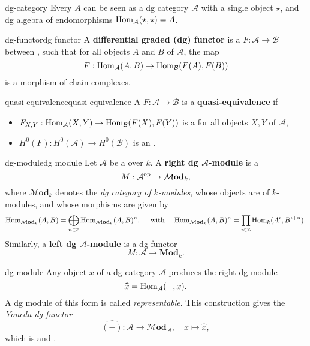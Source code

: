 \begin{example}{dg-category}
    Every  $A$ can be seen as a dg category $\mathcal{A}$ with a single object $\star$, and dg algebra of endomorphisms $\text{Hom}_\mathcal{A}(\star, \star) = A$.
\end{example}

\begin{topic}{dg-functor}{dg functor}
    A \textbf{differential graded (dg) functor} is a  $F : \mathcal{A} \to \mathcal{B}$ between , such that for all objects $A$ and $B$ of $\mathcal{A}$, the map
    \[ F : \text{Hom}_\mathcal{A}(A, B) \to \text{Hom}_\mathcal{B}(F(A), F(B)) \]
    is a morphism of chain complexes.
\end{topic}

\begin{topic}{quasi-equivalence}{quasi-equivalence}
    A  $F : \mathcal{A} \to \mathcal{B}$ is a \textbf{quasi-equivalence} if
    \begin{itemize}
        \item $F_{X, Y} : \text{Hom}_\mathcal{A}(X, Y) \to \text{Hom}_\mathcal{B}(F(X), F(Y))$ is a  for all objects $X, Y$ of $\mathcal{A}$,
        \item $H^0(F) : H^0(\mathcal{A}) \to H^0(\mathcal{B})$ is an .
    \end{itemize}
\end{topic}

\begin{topic}{dg-module}{dg module}
    Let $\mathcal{A}$ be a   over $k$. A \textbf{right dg $\mathcal{A}$-module} is a 
    \[ M : \mathcal{A}^\textup{op} \to \mathcal{M}\textbf{od}_k , \]
    where $\mathcal{M}\textbf{od}_k$ denotes the \textit{dg category of $k$-modules}, whose objects are  of $k$-modules, and whose morphisms are given by
    \[ \text{Hom}_{\mathcal{M}\textbf{od}_k}(A, B) = \bigoplus_{n \in \mathbb{Z}} \text{Hom}_{\mathcal{M}\textbf{od}_k}(A, B)^n, \quad \textup{ with } \quad \text{Hom}_{\mathcal{M}\textbf{od}_k}(A, B)^n = \prod_{i \in \mathbb{Z}} \text{Hom}_k(A^i, B^{i + n}) . \]
    Similarly, a \textbf{left dg $\mathcal{A}$-module} is a dg functor
    \[ M : \mathcal{A} \to \textbf{Mod}_k . \]
\end{topic}

\begin{example}{dg-module}
    Any object $x$ of a dg category $\mathcal{A}$ produces the right dg module
    \[ \widehat{x} = \text{Hom}_\mathcal{A}(-, x) . \]
    A dg module of this form is called \textit{representable}. This construction gives the \textit{Yoneda dg functor}
    \[ \widehat{(-)} : \mathcal{A} \to \mathcal{M}\textbf{od}_\mathcal{A}, \quad x \mapsto \widehat{x} , \]
    which is  and .
\end{example}

